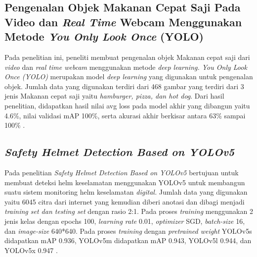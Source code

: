 \subsection{Pengenalan Objek Makanan Cepat Saji Pada Video dan \textit{Real Time} Webcam Menggunakan Metode \textit{You Only Look Once} (YOLO)}
\label{subsec:pengenalanobjekrealtime}
Pada penelitian ini, peneliti membuat pengenalan objek Makanan cepat saji dari \textit{video} dan \textit{real time webcam} menggunakan metode \textit{deep learning. You Only Look Once (YOLO)} merupakan model \textit{deep learning} yang digunakan untuk pengenalan objek. Jumlah data yang digunakan terdiri dari 468 gambar yang terdiri dari 3 jenis Makanan cepat saji yaitu \textit{hamburger, pizza, \textnormal{dan} hot dog}. Dari hasil penelitian, didapatkan hasil nilai avg loss pada model akhir yang dibangun yaitu 4.6\%, nilai validasi mAP 100\%, serta akurasi akhir berkisar antara 63\% sampai 100\% \citep*{karlina2020pengenalan}. \par

\subsection{\textit{Safety Helmet Detection Based on YOLOv5}}
\label{subsec:safetyhelmetyolov5}
Pada penelitian \textit{Safety Helmet Detection Based on YOLOv5} bertujuan untuk membuat deteksi helm keselamatan menggunakan YOLOv5 untuk membangun suatu sistem monitoring helm keselamatan \textit{digital.} Jumlah data yang digunakan yaitu 6045 citra dari internet yang kemudian diberi anotasi dan dibagi menjadi \textit{training set \textnormal{dan} testing set} dengan rasio 2:1. Pada proses \textit{training} menggunakan 2 jenis kelas dengan epochs 100, \textit{learning rate} 0.01, \textit{optimizer} SGD, \textit{batch-size} 16, dan \textit{image-size} 640*640. Pada proses \textit{training} dengan \textit{pretrained weight} YOLOv5s didapatkan mAP 0.936, YOLOv5m didapatkan mAP 0.943, YOLOv5l 0.944, dan YOLOv5x 0.947 \citep{zhou2021safety}. \par





